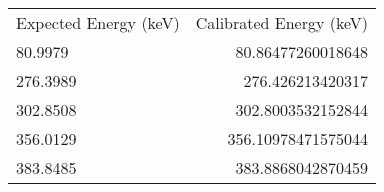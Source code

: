 \begin{table*}
\begin{center}
\begin{tabular}{|lr|}
Expected Energy (keV) & Calibrated Energy (keV) \\
80.9979 & 80.86477260018648 \\
276.3989 & 276.426213420317 \\
302.8508 & 302.8003532152844 \\
356.0129 & 356.10978471575044 \\
383.8485 & 383.8868042870459 \\
\end{tabular}
\end{center}
\end{table*}
